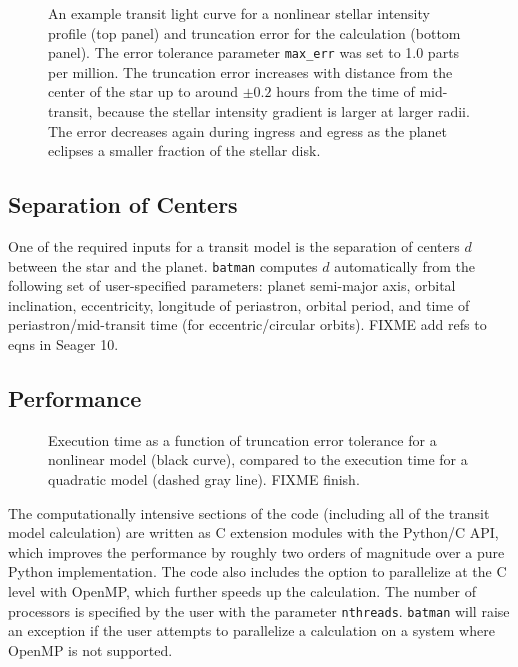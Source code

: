 \documentclass[12pt,preprint]{aastex}
\begin{document}
\begin{figure}
\caption{An example transit light curve for a nonlinear stellar intensity profile (top panel) and truncation error for the calculation (bottom panel).  The error tolerance parameter \texttt{max\_err} was set to 1.0 parts per million.  The truncation error increases with distance from the center of the star up to around $\pm0.2$ hours from the time of mid-transit, because the stellar intensity gradient is larger at larger radii. The error decreases again during ingress and egress as the planet eclipses a smaller fraction of the stellar disk.}
\label{fig:transit}
\end{figure}

\subsection{Separation of Centers}
One of the required inputs for a transit model is the separation of centers $d$ between the star and the planet.  \texttt{batman} computes $d$ automatically from the following set of user-specified parameters: planet semi-major axis, orbital inclination, eccentricity, longitude of periastron, orbital period, and time of periastron/mid-transit time (for eccentric/circular orbits). FIXME add refs to eqns in Seager 10. 



\subsection{Performance}
\begin{figure}
\caption{Execution time as a function of truncation error tolerance for a nonlinear model (black curve), compared to the execution time for a quadratic model (dashed gray line). FIXME finish.}
\label{fig:performance}
\end{figure}
The computationally intensive sections of the code (including all of the transit model calculation) are written as C extension modules with the Python/C API, which improves the performance by roughly two orders of magnitude over a pure Python implementation.  The code also includes the option to parallelize at the C level with OpenMP, which further speeds up the calculation. The number of processors is specified by the user with the parameter \texttt{nthreads}.  \texttt{batman} will raise an exception if the user attempts to parallelize a calculation on a system where OpenMP is not supported.
\end{document}
